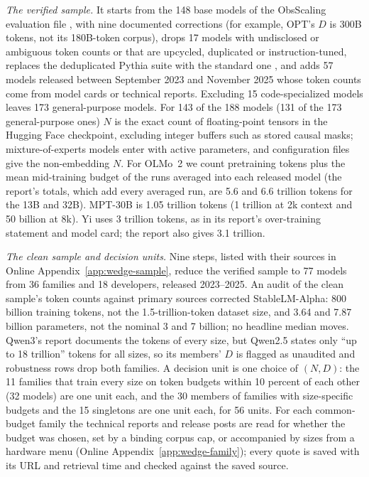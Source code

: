 \textit{The verified sample.} It starts from the 148 base models of the ObsScaling evaluation file
\citep{ruan2024observational}, with nine documented corrections (for example, OPT's $D$ is 300B tokens, not its 180B-token
corpus), drops 17 models with undisclosed or ambiguous token counts or that are upcycled, duplicated or
instruction-tuned, replaces the deduplicated Pythia suite with the standard one \citep{biderman2023pythia}, and adds 57
models released between September 2023 and November 2025 whose token counts come from model cards or technical
reports. Excluding 15
code-specialized models leaves 173 general-purpose models. For 143 of the 188 models (131 of the 173 general-purpose ones) $N$ is the exact count of floating-point
tensors in the Hugging Face checkpoint, excluding integer buffers such as stored causal masks; mixture-of-experts models
enter with active parameters, and configuration files give the non-embedding $N$. For OLMo~2 we count pretraining
tokens plus the mean mid-training budget of the runs averaged into each released model (the report's totals, which add
every averaged run, are 5.6 and 6.6 trillion tokens for the 13B and 32B). MPT-30B is 1.05 trillion tokens (1 trillion at
2k context and 50 billion at 8k). Yi uses 3 trillion tokens, as in its report's over-training statement and model card;
the report also gives 3.1 trillion.

\textit{The clean sample and decision units.} Nine steps, listed with their sources in Online
Appendix~\ref{app:wedge-sample}, reduce the verified sample to 77 models from 36 families and 18 developers, released
2023--2025. An audit of the clean sample's token counts against primary sources corrected StableLM-Alpha: 800 billion
training tokens, not the 1.5-trillion-token dataset size, and 3.64 and 7.87 billion parameters, not the nominal 3 and 7
billion; no headline median moves. Qwen3's report documents the tokens of every size, but Qwen2.5 states only
``up to 18 trillion'' tokens for all sizes, so its members' $D$ is flagged as unaudited and robustness rows drop both
families. A decision unit is one choice of $(N,D)$: the 11 families that train every size on token budgets within 10
percent of each other (32 models) are one unit each, and the 30 members of families with size-specific budgets and the 15
singletons are one unit each, for 56 units. For each common-budget family the technical reports and release posts are
read for whether the budget was chosen, set by a binding corpus cap, or accompanied by sizes from a hardware menu (Online
Appendix~\ref{app:wedge-family}); every quote is saved with its URL and retrieval time and checked against the saved
source.

